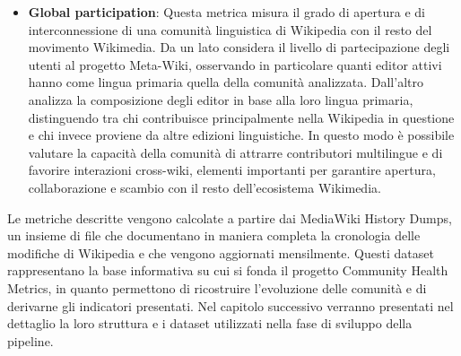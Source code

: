 \begin{itemize}
    \item \textbf{Global participation}: Questa metrica misura il grado di apertura e di interconnessione di una comunità linguistica di Wikipedia con il resto del movimento Wikimedia. Da un lato considera il livello di partecipazione degli utenti al progetto Meta-Wiki, osservando in particolare quanti editor attivi hanno come lingua primaria quella della comunità analizzata. Dall’altro analizza la composizione degli editor in base alla loro lingua primaria, distinguendo tra chi contribuisce principalmente nella Wikipedia in questione e chi invece proviene da altre edizioni linguistiche. In questo modo è possibile valutare la capacità della comunità di attrarre contributori multilingue e di favorire interazioni cross-wiki, elementi importanti per garantire apertura, collaborazione e scambio con il resto dell’ecosistema Wikimedia.
\end{itemize}

Le metriche descritte vengono calcolate a partire dai MediaWiki History Dumps, un insieme di file che documentano in maniera completa la cronologia delle modifiche di Wikipedia e che vengono aggiornati mensilmente. Questi dataset rappresentano la base informativa su cui si fonda il progetto Community Health Metrics, in quanto permettono di ricostruire l’evoluzione delle comunità e di derivarne gli indicatori presentati. Nel capitolo successivo verranno presentati nel dettaglio la loro struttura e i dataset utilizzati nella fase di sviluppo della pipeline.
